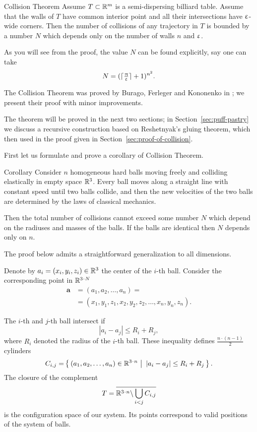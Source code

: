 \begin{thm}{Collision Theorem}\label{thm:collision}
Assume $T\subset\RR^m$
is a semi-dispersing billiard table.
Assume that the walls of $T$ have common interior point 
and all their intersections have $\upvarepsilon$-wide corners.
Then the number of collisions of any trajectory in  $T$  is bounded
by a number $N$ which depends only on the number of walls $n$ and $\upvarepsilon$.
\end{thm}

As you will see from the proof,
the value $N$ can be found explicitly,
say one can take 
\[N=(\lceil\tfrac{\uppi}{\upvarepsilon}\rceil+1)^{n^2}.\]

The Collision Theorem was proved by Burago, Ferleger and Kononenko in \cite{BFK};
we present their proof with minor improvements.

The theorem will be proved in the next two sections;
in Section~\ref{sec:puff-pastry} we discuss a recursive construction based on Reshetnyak's gluing theorem,
which then used in the proof given in Section~\ref{sec:proof-of-collision}.

First let us formulate and prove a corollary of Collision Theorem.

\begin{thm}{Corollary}\label{cor:balls}
Consider $n$ homogeneous hard balls
moving freely and colliding
elastically in empty space $\mathbb{R}^3$. 
Every ball moves
along a straight line with constant speed until two balls collide, and then
the new velocities of the two balls are determined by the
laws of classical mechanics.

Then the total number of collisions cannot exceed some number $N$ which depend on the radiuses and masses of the balls.
If the balls are identical then $N$ depends only on $n$.
\end{thm}

The proof below admits a straightforward generalization to all dimensions.

Denote by $a_i=(x_i,y_i,z_i) \in \RR^3$ the center of the $i$-th ball.
Consider the corresponding point in $\RR^{3\cdot N}$
\begin{align*}
\bm{a}&=(a_1, a_2 , \dots , a_n ) =
\\
&=(x_1, y_1 , z_1 , x_2 , y_2 , z_2 , \dots , x_n , y_n , z_n).
\end{align*}

The $i$-th and $j$-th ball intersect if 
$$|a_i - a_j | \le R_i+R_j,$$
where $R_i$ denoted the radius of the $i$-th ball.
These inequality defines $\tfrac{n\cdot(n-1)}{2}$ cylinders 
\[C_{i,j}=\set{(a_1, a_2 , \dots , a_n )\in\RR^{3\cdot n}} {|a_i - a_j | \le R_i+R_j}.\] 
The closure of the complement
\[T=\overline{\RR^{3\cdot n}\backslash \bigcup_{i< j} C_{i,j}}\] 
is the configuration space of our system. 
Its points correspond
to valid positions of the system of balls.

